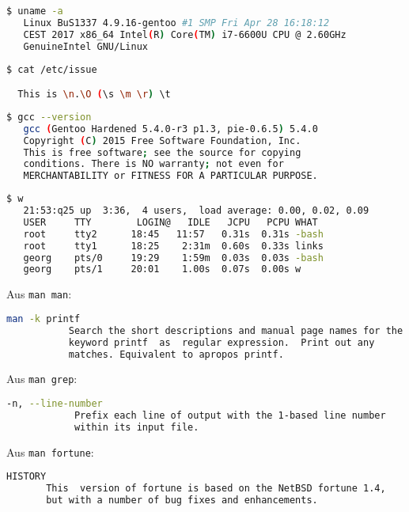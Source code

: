 \documentclass[a4paper,twoside,subproblemsty=arabic,subsubproblemsty=alph,listings,helvet]{homeworkassignment}
\author{Max Mustermann Matr.Nr. 1701 \\ Autor Zwei Matr.Nr. 4711 \\ Dritter Kollaborateur Matr.Nr. 4242 }
\date{\today}
\author{Adrian C. Hinrichs, Matr. 74656}
\date{\today}
\begin{document}
\maketitle
\makeGradingTable
\newproblem[1]
\newproblem*[3]
\newproblem[2]

\newsubproblem[1]
\newsubsubproblem
\begin{lstlisting}[language=bash]
  $ uname -a
   Linux BuS1337 4.9.16-gentoo #1 SMP Fri Apr 28 16:18:12
   CEST 2017 x86_64 Intel(R) Core(TM) i7-6600U CPU @ 2.60GHz
   GenuineIntel GNU/Linux  
\end{lstlisting}

\begin{lstlisting}[language=bash]
  $ cat /etc/issue

  This is \n.\O (\s \m \r) \t
\end{lstlisting}
\begin{lstlisting}[language=bash]
  $ gcc --version
   gcc (Gentoo Hardened 5.4.0-r3 p1.3, pie-0.6.5) 5.4.0
   Copyright (C) 2015 Free Software Foundation, Inc.
   This is free software; see the source for copying
   conditions. There is NO warranty; not even for
   MERCHANTABILITY or FITNESS FOR A PARTICULAR PURPOSE.
\end{lstlisting}

\begin{lstlisting}[language=bash]
  $ w
   21:53:q25 up  3:36,  4 users,  load average: 0.00, 0.02, 0.09
   USER     TTY        LOGIN@   IDLE   JCPU   PCPU WHAT
   root     tty2      18:45   11:57   0.31s  0.31s -bash
   root     tty1      18:25    2:31m  0.60s  0.33s links
   georg    pts/0     19:29    1:59m  0.03s  0.03s -bash
   georg    pts/1     20:01    1.00s  0.07s  0.00s w
\end{lstlisting}
\newsubsubproblem

Aus \texttt{man man}:
\begin{lstlisting}[language=bash]
  man -k printf
           Search the short descriptions and manual page names for the
           keyword printf  as  regular expression.  Print out any
           matches. Equivalent to apropos printf.
\end{lstlisting}

Aus \texttt{man grep}:
\begin{lstlisting}[language=bash]
  -n, --line-number
            Prefix each line of output with the 1-based line number
            within its input file.
\end{lstlisting}

Aus \texttt{man fortune}:
\begin{lstlisting}[language=bash]
  HISTORY
       This  version of fortune is based on the NetBSD fortune 1.4,
       but with a number of bug fixes and enhancements.
\end{lstlisting}
\end{document}
